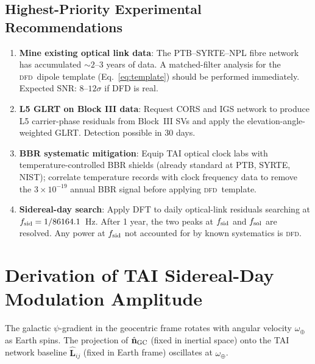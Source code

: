 \documentclass[aps,prd,twocolumn,superscriptaddress,nofootinbib]{revtex4-2}
\newcommand{\DFD}{\textsc{dfd}}
\begin{document}
\subsection{Highest-Priority Experimental Recommendations}

\begin{enumerate}
\item \textbf{Mine existing optical link data}: The PTB--SYRTE--NPL fibre
      network has accumulated $\sim 2$--$3$ years of data. A matched-filter
      analysis for the \DFD\ dipole template (Eq.~\ref{eq:template}) should
      be performed immediately. Expected SNR: $8$--$12\sigma$ if DFD is real.

\item \textbf{L5 GLRT on Block III data}: Request CORS and IGS network
      to produce L5 carrier-phase residuals from Block~III SVs and apply
      the elevation-angle-weighted GLRT. Detection possible in 30 days.

\item \textbf{BBR systematic mitigation}: Equip TAI optical clock labs with
      temperature-controlled BBR shields (already standard at PTB, SYRTE, NIST);
      correlate temperature records with clock frequency data to remove the
      $3\times10^{-19}$ annual BBR signal before applying \DFD\ template.

\item \textbf{Sidereal-day search}: Apply DFT to daily optical-link residuals
      searching at $f_{\rm sid} = 1/86164.1$~Hz. After 1 year, the two peaks
      at $f_{\rm sid}$ and $f_{\rm sol}$ are resolved. Any power at $f_{\rm sid}$
      not accounted for by known systematics is \DFD.
\end{enumerate}

\appendix

\section{Derivation of TAI Sidereal-Day Modulation Amplitude}
\label{app:sid_deriv}

The galactic $\psi$-gradient in the geocentric frame rotates with angular
velocity $\omega_\oplus$ as Earth spins. The projection of
$\hat{\mathbf{n}}_{\rm GC}$ (fixed in inertial space) onto the TAI
network baseline $\hat{\mathbf{L}}_{ij}$ (fixed in Earth frame)
oscillates at $\omega_\oplus$.
\end{document}
